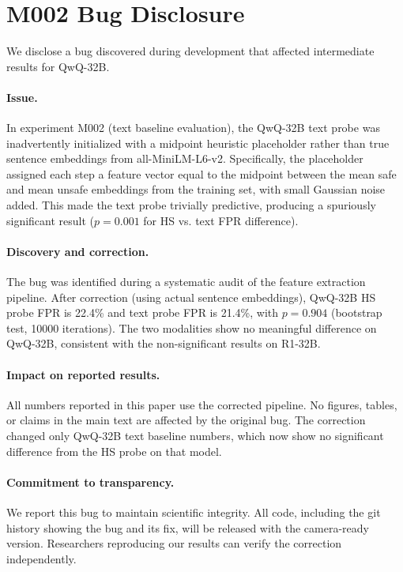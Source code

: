 \section{M002 Bug Disclosure}
\label{app:bug}

We disclose a bug discovered during development that affected intermediate results for QwQ-32B.

\paragraph{Issue.} In experiment M002 (text baseline evaluation), the QwQ-32B text probe was inadvertently initialized with a midpoint heuristic placeholder rather than true sentence embeddings from all-MiniLM-L6-v2. Specifically, the placeholder assigned each step a feature vector equal to the midpoint between the mean safe and mean unsafe embeddings from the training set, with small Gaussian noise added. This made the text probe trivially predictive, producing a spuriously significant result ($p{=}0.001$ for HS vs. text FPR difference).

\paragraph{Discovery and correction.} The bug was identified during a systematic audit of the feature extraction pipeline. After correction (using actual sentence embeddings), QwQ-32B HS probe FPR is 22.4\% and text probe FPR is 21.4\%, with $p{=}0.904$ (bootstrap test, 10000 iterations). The two modalities show no meaningful difference on QwQ-32B, consistent with the non-significant results on R1-32B.

\paragraph{Impact on reported results.} All numbers reported in this paper use the corrected pipeline. No figures, tables, or claims in the main text are affected by the original bug. The correction changed only QwQ-32B text baseline numbers, which now show no significant difference from the HS probe on that model.

\paragraph{Commitment to transparency.} We report this bug to maintain scientific integrity. All code, including the git history showing the bug and its fix, will be released with the camera-ready version. Researchers reproducing our results can verify the correction independently.
